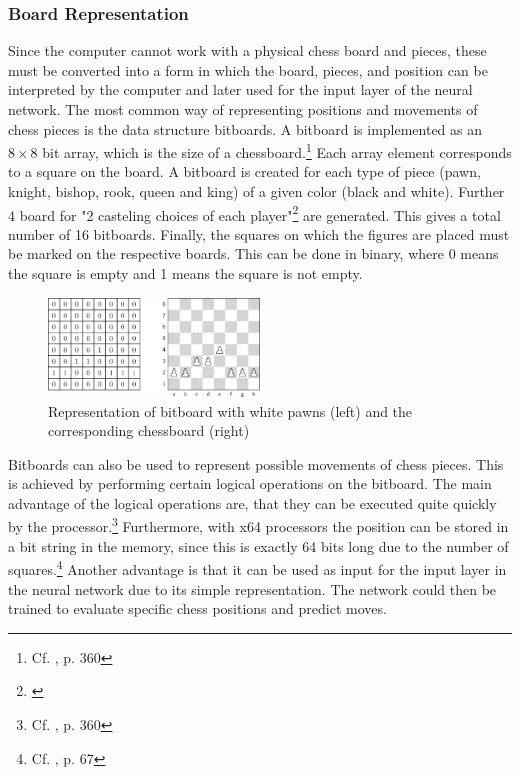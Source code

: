\subsubsection{Board Representation}

Since the computer cannot work with a physical chess board and pieces, these must be converted into a form in which the board, pieces, and position can be interpreted by the computer and later used for the input layer of the neural network. The most common way of representing positions and movements of chess pieces is the data structure bitboards. A bitboard is implemented as an $8 \times 8$ bit array, which is the size of a chessboard.\footnote{Cf. \cite{boskovic-2005-bb}, p. 360} Each array element corresponds to a square on the board. A bitboard is created for each type of piece (pawn, knight, bishop, rook, queen and king) of a given color (black and white). Further 4 board for "2 casteling choices of each player"\footnote{\cite{zang-etal-2019-automated}} are generated. This gives a total number of 16 bitboards. Finally, the squares on which the figures are placed must be marked on the respective boards. This can be done in binary, where 0 means the square is empty and 1 means the square is not empty.

\begin{figure}[h]
\centering
\includegraphics[width=0.5\textwidth]{graphics/bitboard/bitboard_and_chessboard.png}
\caption{Representation of bitboard with white pawns (left) and the corresponding chessboard (right)}
\end{figure}

Bitboards can also be used to represent possible movements of chess pieces. This is achieved by performing certain logical operations on the bitboard. The main advantage of the logical operations are, that they can be executed quite quickly by the processor.\footnote{Cf. \cite{boskovic-2005-bb}, p. 360} Furthermore, with x64 processors the position can be stored in a bit string in the memory, since this is exactly 64 bits long due to the number of squares.\footnote{Cf. \cite{segundo-2005-bb}, p. 67} Another advantage is that it can be used as input for the input layer in the neural network due to its simple representation. The network could then be trained to evaluate specific chess positions and predict moves.